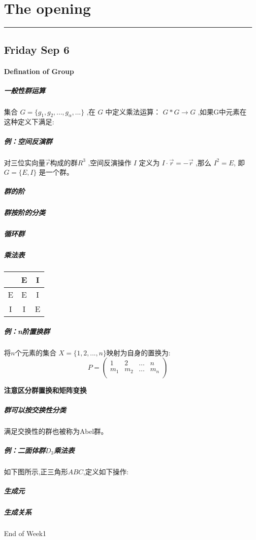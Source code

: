 \section{The opening}
\vspace{-15pt}\noindent\rule{\textwidth}{0.1pt}\vspace{-10pt}
    \subsection{\hfill \small Friday Sep 6}
    
        \paragraph{Defination of Group}
        \subparagraph{一般性群运算}集合 $G = \{g_1,g_2,...,g_\alpha,...\}$ ,在 $G$ 中定义乘法运算： $G*G\rightarrow G$ ,如果G中元素在这种定义下满足:

        \subparagraph*{例：空间反演群}对三位实向量$\vec{r}$构成的群$R^3$ ,空间反演操作 $I$ 定义为 $I\cdot \vec{r}=-\vec{r}$ ,那么 $I^2=E$, 即 $G=\{E,I\}$ 是一个群。

        \subparagraph*{群的阶}
        \subparagraph*{群按阶的分类}
        \subparagraph*{循环群}
        \subparagraph*{乘法表}
        \begin{center}
            \begin{tabular}{c|c c}
                ~ & E & I \\
                \hline
                E & E & I \\
                I & I & E \\
            \end{tabular}
        \end{center}
        
        \subparagraph*{例：n阶置换群}将$n$个元素的集合 $X=\{1,2,...,n\}$映射为自身的置换为:
        \begin{equation*}
            P=
            \left(
                \begin{array}{cccc}
                    1   & 2     & ... & n   \\
                    m_1 & m_2   & ... & m_n \\
                \end{array}
            \right)
        \end{equation*}
        \begin{center}
            \bfseries{注意区分群置换和矩阵变换}
        \end{center}
        \subparagraph*{群可以按交换性分类}满足交换性的群也被称为Abel群。
        \subparagraph*{例：二面体群$D_3$乘法表}如下图所示,正三角形$ABC$,定义如下操作:
        
        \subparagraph*{生成元}
        \subparagraph*{生成关系}
    \hfill End of Week1\pagebreak